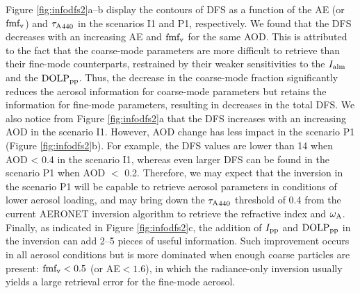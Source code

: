
Figure \ref{fig:infodfs2}a--b display the contours of DFS as a function 
of the AE (or $\text{fmf}_\text{v}$) and ${\tau_\text{A}}_{440}$ in the scenarios I1 and P1, 
respectively. We found that the DFS decreases with an increasing AE and
$\text{fmf}_\text{v}$ for the same AOD. This is attributed to the fact that the 
coarse-mode parameters are more difficult to retrieve than their 
fine-mode counterparts, restrained by their weaker sensitivities to 
the $I_\text{alm}$ and the $\text{DOLP}_\text{pp}$. Thus, the decrease in the coarse-mode 
fraction significantly reduces the aerosol information for coarse-mode 
parameters but retains the information for fine-mode parameters, resulting in 
decreases in the total DFS. We also notice from Figure
\ref{fig:infodfs2}a that the DFS increases with an increasing AOD in the
scenario I1. However, AOD change has less impact in the scenario P1
(Figure \ref{fig:infodfs2}b). For example, the DFS values are lower than 14 
when AOD < 0.4 in the scenario I1, whereas even larger DFS can be found in 
the scenario P1 when AOD $<$ 0.2. Therefore, we may expect that the inversion 
in the scenario P1 will be capable to retrieve aerosol parameters in conditions
of lower aerosol loading, and may bring down the ${\tau_\text{A}}_{440}$ threshold of 
0.4 from the current AERONET inversion algorithm to retrieve the refractive
index and $\omega_\text{A}$. Finally, as indicated in Figure \ref{fig:infodfs2}c, 
the addition of $I_\text{pp}$ and $\text{DOLP}_\text{pp}$ in the inversion can add 2--5 pieces of 
useful information. Such improvement occurs in all aerosol conditions but is 
more dominated when enough coarse particles are present: $\text{fmf}_\text{v}<0.5$ (or
AE$<1.6$), in which the radiance-only inversion usually yields a large 
retrieval error for the fine-mode aerosol. 

